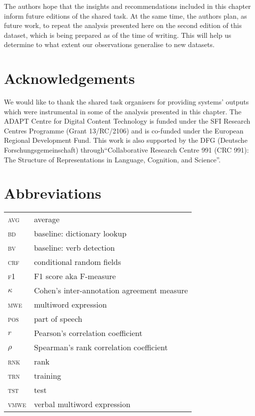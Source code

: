 \documentclass[output=paper
,modfonts
,nonflat,draftmode]{langsci/langscibook}
\begin{document}
The authors hope that the insights and recommendations included in this chapter inform future editions of the shared task. At the same time, the authors plan, as future work, to repeat the analysis presented here on the second edition of this dataset, which is being prepared as of the time of writing. This will help us determine to what extent our observations generalise to new datasets. 

\section*{Acknowledgements}

We would like to thank the shared task organisers for providing systems' outputs which were instrumental in some of the analysis presented in this chapter. The ADAPT Centre for Digital Content Technology is funded under the SFI Research Centres Programme (Grant 13/RC/2106) and is co-funded under the European Regional Development Fund. This work is also supported by the DFG (Deutsche Forschungsgemeinschaft) through``Collaborative
Research Centre 991 (CRC 991): The Structure of
Representations in Language, Cognition, and Science''.

\section*{Abbreviations}\label{sec:mqz-abbrevs}

\begin{tabularx}{.48\textwidth}{ll}
\textsc{avg} & average \\
\textsc{bd} & baseline: dictionary lookup \\
\textsc{bv} & baseline: verb detection \\
\textsc{crf} & conditional random fields \\
\textsc{f1} & F1 score aka F-measure \\
\textsc{$\kappa$} & Cohen's inter-annotation agreement measure \\
\textsc{mwe} & multiword expression \\
\textsc{pos} & part of speech \\
\textsc{$r$} & Pearson's correlation coefficient \\
\textsc{$\rho$} & Spearman's rank correlation coefficient \\
\textsc{rnk} & rank \\
\textsc{trn} & training \\
\textsc{tst} & test \\
\textsc{vmwe} & verbal multiword expression \\
\end{tabularx}
\end{document}
